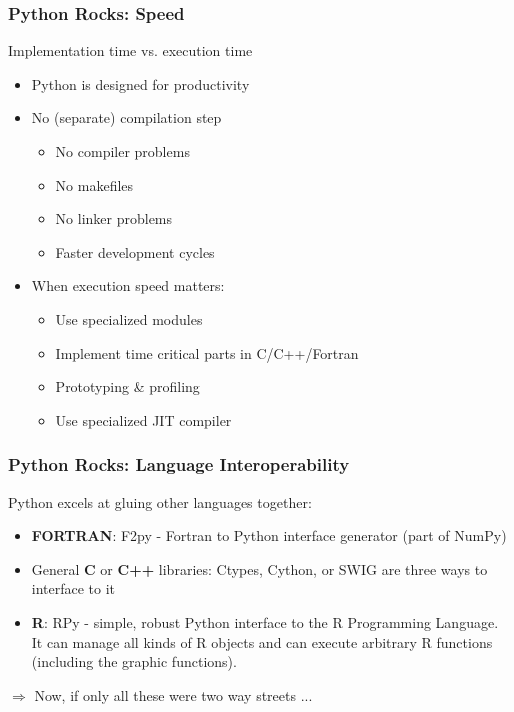\documentclass[t,10pt,compress=false,usepdftitle=false]{beamer}
\begin{document}
\begin{frame}[fragile]
    \frametitle{Python Rocks: Speed}
    Implementation time vs. execution time
    \pause
     \begin{itemize}
    	\item Python is designed for productivity
    	\pause
    	\item No (separate) compilation step
        \begin{itemize}
	    \item No compiler problems
	    \item No makefiles
	    \item No linker problems
	    \item Faster development cycles
        \end{itemize}	    
    	\pause
    	\item When execution speed matters:
        \begin{itemize}
    	    \item Use specialized modules
    	    \item Implement time critical parts in C/C++/Fortran
      	    \item Prototyping \& profiling
      	    \item Use specialized JIT compiler
        \end{itemize}
    \end{itemize}
\end{frame}

\begin{frame}[fragile]
    \frametitle{Python Rocks: Language Interoperability}
    Python excels at gluing other languages together: 
     \begin{itemize}
       \item \textbf{FORTRAN}: F2py - Fortran to Python interface generator (part of NumPy)
       \pause
       \item General \textbf{C} or \textbf{C++} libraries: Ctypes, Cython, or SWIG are three ways to interface to it
       \pause
       \item \textbf{R}: RPy - simple, robust Python interface to the R Programming Language. It can manage all kinds of R objects and can execute arbitrary R functions (including the graphic functions).
    \end{itemize}
    \pause
    $\Longrightarrow$ Now, if only all these were two way streets ...
\end{frame}
\end{document}
